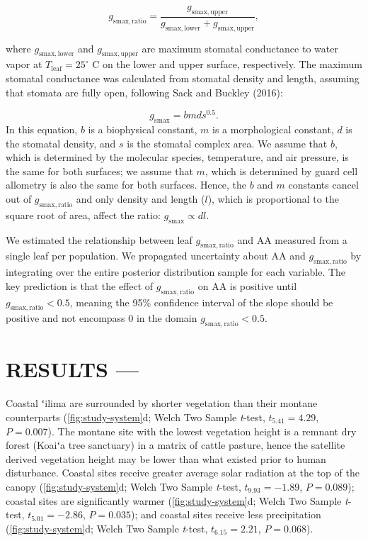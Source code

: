 \documentclass[
  letterpaper,
  DIV=11,
  numbers=noendperiod]{scrartcl}
\begin{document}
\[g_\mathrm{smax,ratio} = \frac{g_\mathrm{smax,upper}}{g_\mathrm{smax,lower} + g_\mathrm{smax,upper}},\]

where \(g_\mathrm{smax,lower}\) and \(g_\mathrm{smax,upper}\) are
maximum stomatal conductance to water vapor at
\(T_\mathrm{leaf} = 25 ^ \circ\) C on the lower and upper surface,
respectively. The maximum stomatal conductance was calculated from
stomatal density and length, assuming that stomata are fully open,
following Sack and Buckley (2016):

\[g_\mathrm{smax} = bmds^{0.5}.\] In this equation, \(b\) is a
biophysical constant, \(m\) is a morphological constant, \(d\) is the
stomatal density, and \(s\) is the stomatal complex area. We assume that
\(b\), which is determined by the molecular species, temperature, and
air pressure, is the same for both surfaces; we assume that \(m\), which
is determined by guard cell allometry is also the same for both
surfaces. Hence, the \(b\) and \(m\) constants cancel out of
\(g_\mathrm{smax,ratio}\) and only density and length (\(l\)), which is
proportional to the square root of area, affect the ratio:
\(g_\mathrm{smax} \propto dl\).

We estimated the relationship between leaf \(g_\mathrm{smax,ratio}\) and
\(\mathrm{AA}\) measured from a single leaf per population. We
propagated uncertainty about \(\mathrm{AA}\) and
\(g_\mathrm{smax,ratio}\) by integrating over the entire posterior
distribution sample for each variable. The key prediction is that the
effect of \(g_\mathrm{smax,ratio}\) on \(\mathrm{AA}\) is positive until
\(g_\mathrm{smax,ratio} < 0.5\), meaning the 95\% confidence interval of
the slope should be positive and not encompass 0 in the domain
\(g_\mathrm{smax,ratio} < 0.5\).

\hypertarget{results}{%
\section{RESULTS ---}\label{results}}

Coastal ʻilima are surrounded by shorter vegetation than their montane
counterparts (\autoref{fig:study-system}d; Welch Two Sample
\emph{t}-test, \(t_{5.41} = 4.29\), \(P = 0.007\)). The montane site
with the lowest vegetation height is a remnant dry forest (Koaiʻa tree
sanctuary) in a matrix of cattle pasture, hence the satellite derived
vegetation height may be lower than what existed prior to human
disturbance. Coastal sites receive greater average solar radiation at
the top of the canopy (\autoref{fig:study-system}d; Welch Two Sample
\emph{t}-test, \(t_{9.93} = -1.89\), \(P = 0.089\)); coastal sites are
significantly warmer (\autoref{fig:study-system}d; Welch Two Sample
\emph{t}-test, \(t_{5.01} = -2.86\), \(P = 0.035\)); and coastal sites
receive less precipitation (\autoref{fig:study-system}d; Welch Two
Sample \emph{t}-test, \(t_{6.15} = 2.21\), \(P = 0.068\)).
\end{document}
